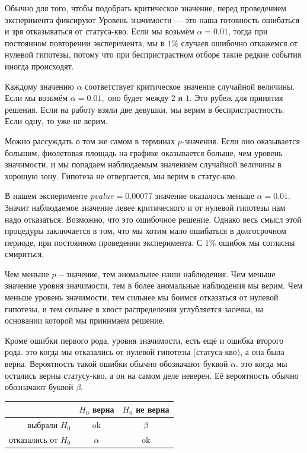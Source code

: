 \documentclass[12pt, a4paper, oneside]{article}
\begin{document}
Обычно для того, чтобы подобрать критическое значение, перед проведением эксперимента фиксируют  Уровень значимости --- это наша готовность ошибаться и зря отказываться от статуса-кво. Если мы возьмём $\alpha = 0.01$, тогда при постоянном повторении эксперимента, мы в $1\%$ случаев ошибочно откажемся от нулевой гипотезы, потому что при беспристрастном отборе такие редкие события иногда происходят. 

Каждому значению $\alpha$ соответствует критическое значение случайной величины. Если мы возьмём $\alpha = 0.01,$ оно будет между $2$ и $1$. Это рубеж для принятия решения. Если на работу взяли две девушки, мы верим в беспристрастность. Если одну, то уже не верим. 

Можно рассуждать о том же самом в терминах $p$-значения. Если оно оказывается большим, фиолетовая площадь на графике оказывается больше, чем уровень значимости, и мы попадаем наблюдаемым значением случайной величины в хорошую зону. Гипотеза не отвергается, мы верим в статус-кво. 

В нашем эксперименте $pvalue = 0.00077$ значение оказалось меньше $\alpha=0.01$. Значит наблюдаемое значение левее критического и от нулевой гипотезы нам надо отказаться. Возможно, что это ошибочное решение. Однако весь смысл этой процедуры заключается в том, что мы хотим мало ошибаться в долгосрочном периоде, при постоянном проведении эксперимента. С $1\%$ ошибок мы согласны смириться. 

Чем меньше $p-$значение, тем аномальнее наши наблюдения. Чем меньше значение уровня значимости, тем в более аномальные наблюдения мы верим. Чем меньше уровень значимости, тем сильнее мы боимся отказаться от нулевой гипотезы, и тем сильнее в хвост распределения углубляется засечка, на основании которой мы принимаем решение. 

Кроме ошибки первого рода, уровня значимости, есть ещё и ошибка второго рода.  это когда мы отказались от нулевой гипотезы (статуса-кво), а она была верна. Вероятность такой ошибки обычно обозначают буквой $\alpha$.  это когда мы остались верны статусу-кво, а он на самом деле неверен. Её вероятность обычно обозначают буквой $\beta$. 

\begin{center}
	\begin{tabular}{|r|c|c|}
	\hline
	                    & $H_0$ верна & $H_0$ не верна \\  \hline 
	выбрали $H_0$       &  ok &    $\beta$ \\      \hline 
	отказались от $H_0$ &   $\alpha$ &  ok \\      \hline 
	\end{tabular}
\end{center}
\end{document}
